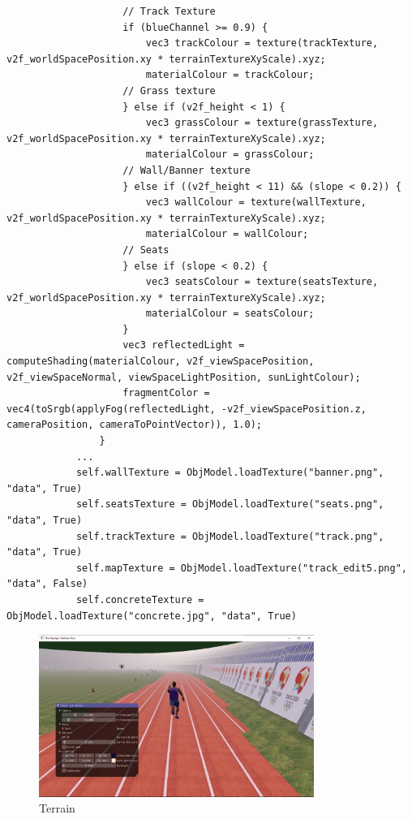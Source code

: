 \documentclass[a4 paper, 12pt]{article}
\begin{document}
\begin{lstlisting}
                    // Track Texture
                    if (blueChannel >= 0.9) {
                        vec3 trackColour = texture(trackTexture, v2f_worldSpacePosition.xy * terrainTextureXyScale).xyz;
                        materialColour = trackColour;
                    // Grass texture
                    } else if (v2f_height < 1) {
                        vec3 grassColour = texture(grassTexture, v2f_worldSpacePosition.xy * terrainTextureXyScale).xyz;
                        materialColour = grassColour; 
                    // Wall/Banner texture
                    } else if ((v2f_height < 11) && (slope < 0.2)) {
                        vec3 wallColour = texture(wallTexture, v2f_worldSpacePosition.xy * terrainTextureXyScale).xyz;
                        materialColour = wallColour;                  
                    // Seats
                    } else if (slope < 0.2) {
                        vec3 seatsColour = texture(seatsTexture, v2f_worldSpacePosition.xy * terrainTextureXyScale).xyz;
                        materialColour = seatsColour; 
                    }
                    vec3 reflectedLight = computeShading(materialColour, v2f_viewSpacePosition, v2f_viewSpaceNormal, viewSpaceLightPosition, sunLightColour);
                    fragmentColor = vec4(toSrgb(applyFog(reflectedLight, -v2f_viewSpacePosition.z, cameraPosition, cameraToPointVector)), 1.0);
                }
            ...
            self.wallTexture = ObjModel.loadTexture("banner.png", "data", True)
            self.seatsTexture = ObjModel.loadTexture("seats.png", "data", True)
            self.trackTexture = ObjModel.loadTexture("track.png", "data", True)
            self.mapTexture = ObjModel.loadTexture("track_edit5.png", "data", False)
            self.concreteTexture = ObjModel.loadTexture("concrete.jpg", "data", True)
    \end{lstlisting}

\begin{figure} [H]
    \centering
    \includegraphics[width=0.8\textwidth, frame]
        {./images/olympics/terrain_world.PNG}  
    \caption{Terrain}   
\end{figure}
\end{document}
